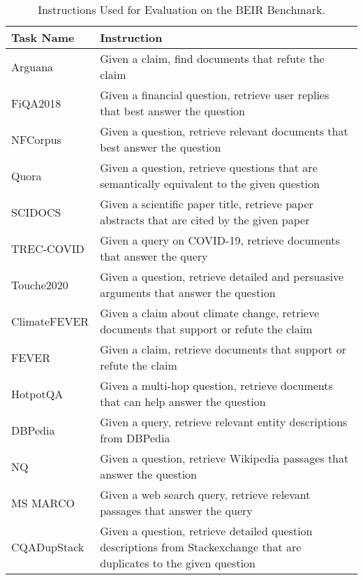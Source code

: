 \begin{table*}[t]
\centering
\small
\begin{tabular}{l|p{11cm}}
\hline
\textbf{Task Name} & \textbf{Instruction} \\
\hline
Arguana & Given a claim, find documents that refute the claim \\
\hline
FiQA2018 & Given a financial question, retrieve user replies that best answer the question \\
\hline

NFCorpus & Given a question, retrieve relevant documents that best answer the question \\
\hline

Quora & Given a question, retrieve questions that are semantically equivalent to the given question \\
\hline

SCIDOCS & Given a scientific paper title, retrieve paper abstracts that are cited by the given paper \\
\hline

TREC-COVID & Given a query on COVID-19, retrieve documents that answer the query \\
\hline

Touche2020 & Given a question, retrieve detailed and persuasive arguments that answer the question \\
\hline
ClimateFEVER & Given a claim about climate change, retrieve documents that support or refute the claim \\
\hline
FEVER & Given a claim, retrieve documents that support or refute the claim \\
\hline
HotpotQA & Given a multi-hop question, retrieve documents that can help answer the question \\
\hline
DBPedia &  Given a query, retrieve relevant entity descriptions from DBPedia\\
\hline
NQ & Given a question, retrieve Wikipedia passages that answer the question \\
\hline
MS MARCO & Given a web search query, retrieve relevant passages that answer the query \\
\hline
\multirow{2}{*}{CQADupStack} & Given a question, retrieve detailed question descriptions from Stackexchange that are duplicates to the given question \\

\hline
\end{tabular}
\caption{Instructions Used for Evaluation on the BEIR Benchmark.}
\label{tab:retrieval_dataset}
\end{table*}
